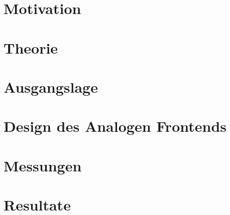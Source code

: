 \documentclass{fhnwreport} %
\begin{document}
\section{Motivation}
\label{sec:motivation}


\clearpage

\section{Theorie}
\label{sec:sdr}


\clearpage

\section{Ausgangslage}
\label{sec:ausgangslage}


\clearpage

\section{Design des Analogen Frontends}
\label{sec:afe}


\clearpage

\section{Messungen}
\label{sec:messungen}


\clearpage

\section{Resultate}
\label{sec:resultate}

\end{document}
